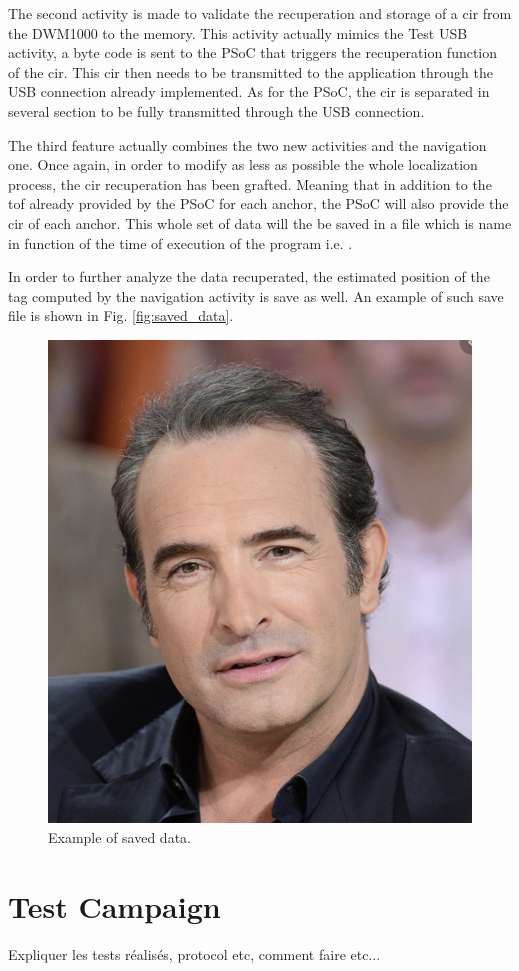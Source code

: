 The second activity is made to validate the recuperation and storage of a \gls{cir} from the DWM1000 to the memory. This activity actually mimics the Test USB activity, a byte code is sent to the PSoC that triggers the recuperation function of the \gls{cir}. This \gls{cir} then needs to be transmitted to the application through the USB connection already implemented. As for the PSoC, the \gls{cir} is separated in several section to be fully transmitted through the USB connection.
\vspace{2mm}

The third feature actually combines the two new activities and the navigation one. Once again, in order to modify as less as possible the whole localization process, the \gls{cir} recuperation has been grafted. Meaning that in addition to the \gls{tof} already provided by the PSoC for each anchor, the PSoC will also provide the \gls{cir} of each anchor. This whole set of data will the be saved in a  file which is name in function of the time of execution of the program i.e. .
\vspace{2mm}

In order to further analyze the data recuperated, the estimated position of the tag computed by the navigation activity is save as well. An example of such save file is shown in Fig. \ref{fig:saved_data}.

\begin{figure}[H]
\centering
\includegraphics[width=.2\linewidth]{Images/Temporary_pic.png}
\caption{Example of saved data. \label{fig:save_data}}
\end{figure}

\section{Test Campaign}

Expliquer les tests réalisés, protocol etc, comment faire etc...